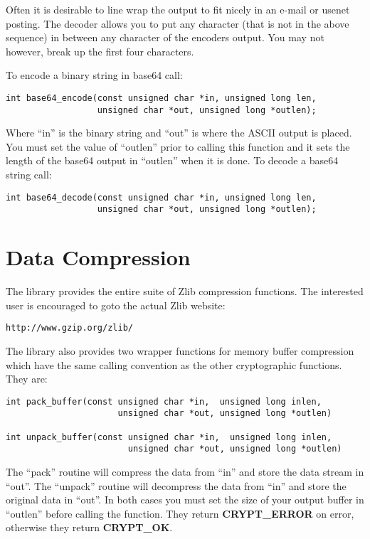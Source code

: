 \documentclass{book}
\begin{document}
Often it is desirable to line wrap the output to fit nicely in an e-mail or usenet posting.  The decoder allows you to
put any character (that is not in the above sequence) in between any character of the encoders output.  You may not however,
break up the first four characters.

To encode a binary string in base64 call:
   
\begin{verbatim}
int base64_encode(const unsigned char *in, unsigned long len, 
                  unsigned char *out, unsigned long *outlen);
\end{verbatim}
Where ``in'' is the binary string and ``out'' is where the ASCII output is placed.  You must set the value of ``outlen'' prior
to calling this function and it sets the length of the base64 output in ``outlen'' when it is done.  To decode a base64 
string call:
\begin{verbatim}
int base64_decode(const unsigned char *in, unsigned long len, 
                  unsigned char *out, unsigned long *outlen);
\end{verbatim}

\section{Data Compression}
The library provides the entire suite of Zlib compression functions.  The interested user is encouraged to goto the actual
Zlib website:
\begin{verbatim}
http://www.gzip.org/zlib/
\end{verbatim}
The library also provides two wrapper functions for memory buffer compression which have the same calling convention
as the other cryptographic functions.  They are:
\begin{verbatim}
int pack_buffer(const unsigned char *in,  unsigned long inlen,
                      unsigned char *out, unsigned long *outlen)

int unpack_buffer(const unsigned char *in,  unsigned long inlen,
                        unsigned char *out, unsigned long *outlen)
\end{verbatim}
The ``pack'' routine will compress the data from ``in'' and store the data stream in ``out''.  The ``unpack'' routine
will decompress the data from ``in'' and store the original data in ``out''.  In both cases you must set the size of your
output buffer in ``outlen'' before calling the function.  They return {\bf CRYPT\_ERROR} on error, otherwise they return
{\bf CRYPT\_OK}.
\end{document}
